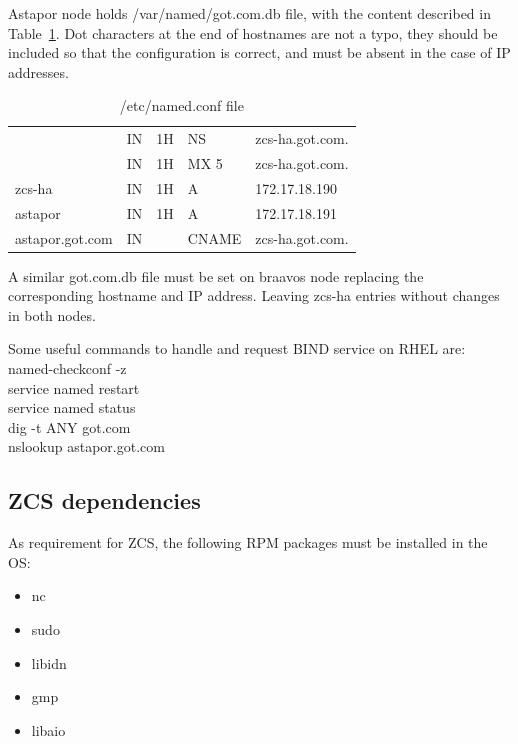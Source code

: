 \documentclass[a4paper, 12pt]{book}
\begin{document}
\noindent Astapor node holds /var/named/got.com.db file, with the content described in Table~\ref{table:bindastapor}. Dot characters at the end of hostnames are not a typo, they should be included so that the configuration is correct, and must be absent in the case of IP addresses.

\FloatBarrier
\begin{table}[H]
  \centering
  \begin{tabular}{ | l l l l l | }
    \hline
	                  & IN & 1H & NS    & zcs-ha.got.com.\\
                      & IN & 1H & MX 5  & zcs-ha.got.com.\\
      zcs-ha          & IN & 1H & A     & 172.17.18.190\\
      astapor         & IN & 1H & A     & 172.17.18.191\\
      astapor.got.com & IN &    & CNAME & zcs-ha.got.com.\\
    \hline
  \end{tabular}
\caption{/etc/named.conf file}
\label{table:bindastapor}
\end{table}

\noindent A similar got.com.db file must be set on braavos node replacing the corresponding hostname and IP address. Leaving zcs-ha entries without changes in both nodes.\bigskip

\noindent Some useful commands to handle and request BIND service on RHEL are:\\
\indent named-checkconf -z \\
\indent service named restart \\
\indent service named status \\
\indent dig -t ANY got.com \\
\indent nslookup astapor.got.com

\subsection{ZCS dependencies}
\label{sec:zcsdeps}

As requirement for ZCS, the following RPM packages must be installed in the OS:

\begin{itemize}
	\item nc
	\item sudo
	\item libidn 
	\item gmp 
	\item libaio 
\end{itemize}
\end{document}

